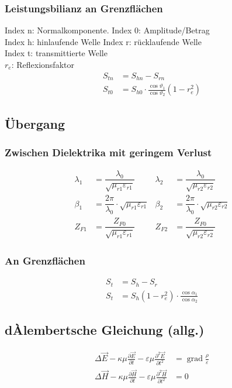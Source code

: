 \subsubsection{Leistungsbilianz an Grenzflächen}
Index n: Normalkomponente. \quad Index 0: Amplitude/Betrag\\
Index h: hinlaufende Welle \quad Index r: rücklaufende Welle\\
Index t: transmittierte Welle\\
$r_e$: Reflexionsfaktor
\begin{align*}
	S_{tn} & = S_{hn} - S_{rn}                                                  \\
	S_{t0} & = S_{h0}\cdot \frac{\cos\vartheta_{1}}{\cos\vartheta_{2}}(1-r_e^2)
\end{align*}

\subsection{Übergang}
\subsubsection{Zwischen Dielektrika mit geringem Verlust}
\begin{align*}
    \lambda_1 & = \dfrac{\lambda_0}{\sqrt{\mu_{r1}\varepsilon_{r1}}}          & \lambda_2 & = \dfrac{\lambda_0}{\sqrt{\mu_{r2}\varepsilon_{r2}}}                                     \\
    \beta_1   & = \dfrac{2\pi}{\lambda_0}\cdot\sqrt{\mu_{r1}\varepsilon_{r1}} & \beta_2   & = \dfrac{2\pi}{\lambda_0}\cdot\sqrt{\mu_{r2}\varepsilon_{r2}}                            \\
    Z_{F1}    & = \dfrac{Z_{F0}}{\sqrt{\mu_{r1}\varepsilon_{r1}}}             & Z_{F2}    & = \dfrac{Z_{F0}}{\sqrt{\mu_{r2}\varepsilon_{r2}}}
\end{align*}

\subsubsection{An Grenzflächen}
\begin{align*}
    S_t &= S_h - S_r \\
    S_t &= S_h  (1 - r_e^2) \cdot \frac{\cos \alpha_1}{\cos \alpha_2}
\end{align*}

\subsection{dÀlembertsche Gleichung (allg.)}
\begin{align*}
    \Delta \vec{E}-\kappa \mu \frac{\partial \vec{E}}{\partial t}-\varepsilon \mu \frac{\partial^{2} \vec{E}}{\partial t^{2}} & = \operatorname{grad} \frac{\rho}{\varepsilon} \\
    \Delta \vec{H}-\kappa \mu \frac{\partial \vec{H}}{\partial t}-\varepsilon \mu \frac{\partial^{2} \vec{H}}{\partial t^{2}} & = 0
\end{align*}

